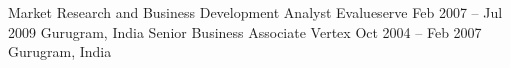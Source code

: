 \documentclass[a4paper,]{fortysecondscv}
\begin{document}
\begin{cvtable}
    \vspace{\topsep}
    \cvitemoneblock
    {Market Research and Business Development Analyst}
    {Evalueserve}
    {Feb 2007 -- Jul 2009}
    {Gurugram, India}
    {
    }
    \vspace{\topsep}
    \cvitemoneblock
    {Senior Business Associate}
    {Vertex}
    {Oct 2004 -- Feb 2007}
    {Gurugram, India}
    {
    }
\end{cvtable}





\newpage
\makebacksidebar



\end{document}
